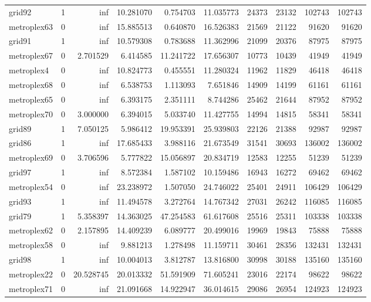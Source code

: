 \begin{longtable}{|l|r|r|r|r|r|r|r|r|r|}
grid92 & 1 & inf & 10.281070 & 0.754703 & 11.035773 & 24373 & 23132 & 102743 & 102743 \\
metroplex63 & 0 & inf & 15.885513 & 0.640870 & 16.526383 & 21569 & 21122 & 91620 & 91620 \\
grid91 & 1 & inf & 10.579308 & 0.783688 & 11.362996 & 21099 & 20376 & 87975 & 87975 \\
metroplex67 & 0 & 2.701529 & 6.414585 & 11.241722 & 17.656307 & 10773 & 10439 & 41949 & 41949 \\
metroplex4 & 0 & inf & 10.824773 & 0.455551 & 11.280324 & 11962 & 11829 & 46418 & 46418 \\
metroplex68 & 0 & inf & 6.538753 & 1.113093 & 7.651846 & 14909 & 14199 & 61161 & 61161 \\
metroplex65 & 0 & inf & 6.393175 & 2.351111 & 8.744286 & 25462 & 21644 & 87952 & 87952 \\
metroplex70 & 0 & 3.000000 & 6.394015 & 5.033740 & 11.427755 & 14994 & 14815 & 58341 & 58341 \\
grid89 & 1 & 7.050125 & 5.986412 & 19.953391 & 25.939803 & 22126 & 21388 & 92987 & 92987 \\
grid86 & 1 & inf & 17.685433 & 3.988116 & 21.673549 & 31541 & 30693 & 136002 & 136002 \\
metroplex69 & 0 & 3.706596 & 5.777822 & 15.056897 & 20.834719 & 12583 & 12255 & 51239 & 51239 \\
grid97 & 1 & inf & 8.572384 & 1.587102 & 10.159486 & 16943 & 16272 & 69462 & 69462 \\
metroplex54 & 0 & inf & 23.238972 & 1.507050 & 24.746022 & 25401 & 24911 & 106429 & 106429 \\
grid93 & 1 & inf & 11.494578 & 3.272764 & 14.767342 & 27031 & 26242 & 116085 & 116085 \\
grid79 & 1 & 5.358397 & 14.363025 & 47.254583 & 61.617608 & 25516 & 25311 & 103338 & 103338 \\
metroplex62 & 0 & 2.157895 & 14.409239 & 6.089777 & 20.499016 & 19969 & 19843 & 75888 & 75888 \\
metroplex58 & 0 & inf & 9.881213 & 1.278498 & 11.159711 & 30461 & 28356 & 132431 & 132431 \\
grid98 & 1 & inf & 10.004013 & 3.812787 & 13.816800 & 30998 & 30188 & 135160 & 135160 \\
metroplex22 & 0 & 20.528745 & 20.013332 & 51.591909 & 71.605241 & 23016 & 22174 & 98622 & 98622 \\
metroplex71 & 0 & inf & 21.091668 & 14.922947 & 36.014615 & 29086 & 26954 & 124923 & 124923 \\

\end{longtable}

